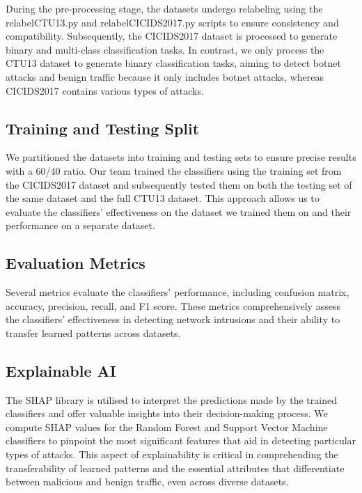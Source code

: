 During the pre-processing stage, the datasets undergo relabeling using the relabelCTU13.py and relabelCICIDS2017.py scripts to ensure consistency and compatibility. Subsequently, the CICIDS2017 dataset is processed to generate binary and multi-class classification tasks. In contrast, we only process the CTU13 dataset to generate binary classification tasks, aiming to detect botnet attacks and benign traffic because it only includes botnet attacks, whereas CICIDS2017 contains various types of attacks.

\subsection{Training and Testing Split}\label{subsec:TrainingTestingSplit}

We partitioned the datasets into training and testing sets to ensure precise results with a 60/40 ratio. Our team trained the classifiers using the training set from the CICIDS2017 dataset and subsequently tested them on both the testing set of the same dataset and the full CTU13 dataset. This approach allows us to evaluate the classifiers' effectiveness on the dataset we trained them on and their performance on a separate dataset.

\subsection{Evaluation Metrics}\label{subsec:EvaluationMetrics}

Several metrics evaluate the classifiers' performance, including confusion matrix, accuracy, precision, recall, and F1 score. These metrics comprehensively assess the classifiers' effectiveness in detecting network intrusions and their ability to transfer learned patterns across datasets.

\subsection{Explainable AI}\label{subsec:ExplainableAI}

The SHAP library is utilised to interpret the predictions made by the trained classifiers and offer valuable insights into their decision-making process. We compute SHAP values for the Random Forest and Support Vector Machine classifiers to pinpoint the most significant features that aid in detecting particular types of attacks. This aspect of explainability is critical in comprehending the transferability of learned patterns and the essential attributes that differentiate between malicious and benign traffic, even across diverse datasets.

